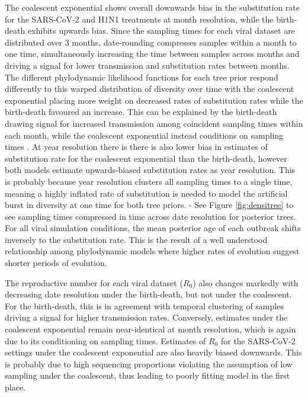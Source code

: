 \documentclass[12pt]{article}
\begin{document}
\begin{spacing}{2}
The coalescent exponential shows overall downwards bias in the substitution rate for the SARS-CoV-2 and H1N1 treatments at month resolution, while the birth-death exhibits upwards bias. Since the sampling times for each viral dataset are distributed over 3 months, date-rounding compresses samples within a month to one time, simultaneously increasing the time between samples across months and driving a signal for lower transmission and substitution rates between months. The different phylodynamic likelihood functions for each tree prior respond differently to this warped distribution of diversity over time with the coalescent exponential placing more weight on decreased rates of substitution rates while the birth-death favoured an increase. This can be explained by the birth-death drawing signal for increased transmission among coincident sampling times within each month, while the coalescent exponential instead conditions on sampling times \citep{volz_sampling_2014}. At year resolution there is there is also lower bias in estimates of substitution rate for the coalescent exponential than the birth-death, however both models estimate upwards-biased substitution rates as year resolution. This is probably because year resolution clusters all sampling times to a single time, meaning a highly inflated rate of substitution is needed to model the artificial burst in diversity at one time for both tree priors. - See Figure \ref{fig:densitree} to see sampling times compressed in time across date resolution for posterior trees. For all viral simulation conditions, the mean posterior age of each outbreak shifts inversely to the substitution rate. This is the result of a well understood relationship among phylodynamic models where higher rates of evolution suggest shorter periods of evolution.

The reproductive number for each viral dataset ($R_0$) also changes markedly with decreasing date resolution under the birth-death, but not under the coalescent. For the birth-death, this is in agreement with temporal clustering of samples driving a signal for higher transmission rates. Conversely, estimates under the coalescent exponential remain near-identical at month resolution, which is again due to its conditioning on sampling times. Estimates of $R_0$ for the SARS-CoV-2 settings under the coalescent exponential are also heavily biased downwards. This is probably due to high sequencing proportions violating the assumption of low sampling under the coalescent, thus leading to poorly fitting model in the first place.


\end{spacing}
\end{document}
